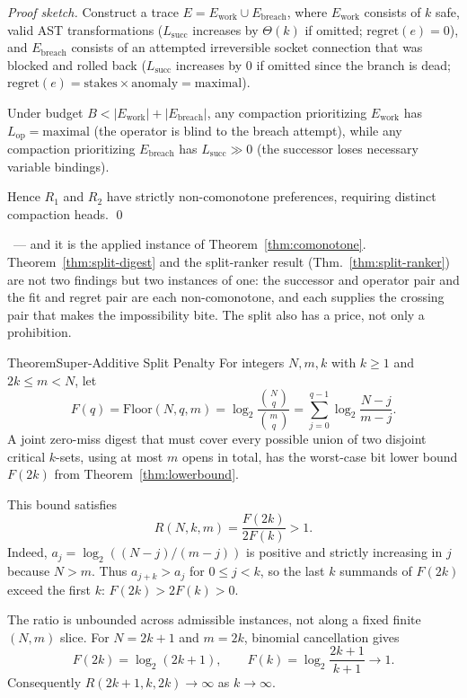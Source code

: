 \documentclass[11pt,a4paper]{article}
\theoremstyle{definition}
\theoremstyle{plain}
\begin{document}
\begin{proof}[Proof sketch]
\setlength{\parskip}{4pt plus 1pt}
Construct a trace $E = E_{\mathrm{work}} \cup E_{\mathrm{breach}}$, where $E_{\mathrm{work}}$ consists of $k$ safe, valid AST transformations ($L_{\mathrm{succ}}$ increases by $\Theta(k)$ if omitted; $\mathrm{regret}(e) = 0$), and $E_{\mathrm{breach}}$ consists of an attempted irreversible socket connection that was blocked and rolled back ($L_{\mathrm{succ}}$ increases by $0$ if omitted since the branch is dead; $\mathrm{regret}(e) = \mathrm{stakes} \times \mathrm{anomaly} = \text{maximal}$).

Under budget $B < |E_{\mathrm{work}}| + |E_{\mathrm{breach}}|$, any compaction prioritizing $E_{\mathrm{work}}$ has $L_{\mathrm{op}} = \text{maximal}$ (the operator is blind to the breach attempt), while any compaction prioritizing $E_{\mathrm{breach}}$ has $L_{\mathrm{succ}} \gg 0$ (the successor loses necessary variable bindings).

Hence $R_1$ and $R_2$ have strictly non-comonotone preferences, requiring distinct compaction heads. \qed
\end{proof}

\noindent\Proved\ --- and it is the applied instance of
Theorem~\ref{thm:comonotone}. Theorem~\ref{thm:split-digest} and the split-ranker
result (Thm.~\ref{thm:split-ranker}) are not two findings but two instances of one:
the successor and operator pair and the fit and regret pair are each
non-comonotone, and each supplies the crossing pair that makes the impossibility
bite. The split also has a price, not only a prohibition.

\begin{pdclaim}{Theorem}{Super-Additive Split Penalty}
\setlength{\parskip}{4pt plus 1pt}
\label{thm:split-penalty}
For integers $N,m,k$ with $k\ge1$ and $2k\le m<N$, let
\[
F(q)=\mathrm{Floor}(N,q,m)
 =\log_2\!\frac{\binom Nq}{\binom mq}
 =\sum_{j=0}^{q-1}\log_2\!\frac{N-j}{m-j}.
\]
A joint zero-miss digest that must cover every possible union of two disjoint
critical $k$-sets, using at most $m$ opens in total, has the worst-case bit
lower bound $F(2k)$ from Theorem~\ref{thm:lowerbound}.

This bound satisfies
\[
R(N,k,m)=\frac{F(2k)}{2F(k)}>1.
\]
Indeed, $a_j=\log_2((N-j)/(m-j))$ is positive and strictly increasing in $j$
because $N>m$. Thus $a_{j+k}>a_j$ for $0\le j<k$, so the last $k$ summands
of $F(2k)$ exceed the first $k$: $F(2k)>2F(k)>0$.

The ratio is unbounded across admissible instances, not along a fixed finite
$(N,m)$ slice. For $N=2k+1$ and $m=2k$, binomial cancellation gives
\[
F(2k)=\log_2(2k+1),\qquad
F(k)=\log_2\!\frac{2k+1}{k+1}\longrightarrow1.
\]
Consequently $R(2k+1,k,2k)\to\infty$ as $k\to\infty$.
\end{pdclaim}
\end{document}
